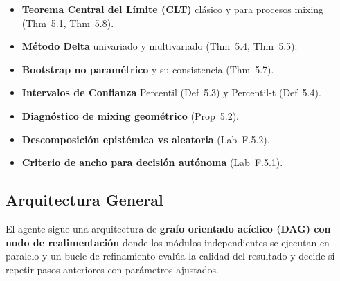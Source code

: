 \documentclass[12pt,a4paper]{article}
\begin{document}
\begin{itemize}
	\item \textbf{Teorema Central del Límite (CLT)} clásico y para procesos mixing (Thm~5.1, Thm~5.8).
	\item \textbf{Método Delta} univariado y multivariado (Thm~5.4, Thm~5.5).
	\item \textbf{Bootstrap no paramétrico} y su consistencia (Thm~5.7).
	\item \textbf{Intervalos de Confianza} Percentil (Def~5.3) y Percentil-t (Def~5.4).
	\item \textbf{Diagnóstico de mixing geométrico} (Prop~5.2).
	\item \textbf{Descomposición epistémica vs aleatoria} (Lab~F.5.2).
	\item \textbf{Criterio de ancho para decisión autónoma} (Lab~F.5.1).
\end{itemize}

\subsection{Arquitectura General}

El agente sigue una arquitectura de \textbf{grafo orientado acíclico (DAG) con nodo de realimentación} donde los módulos independientes se ejecutan en paralelo y un bucle de refinamiento evalúa la calidad del resultado y decide si repetir pasos anteriores con parámetros ajustados.
\end{document}
